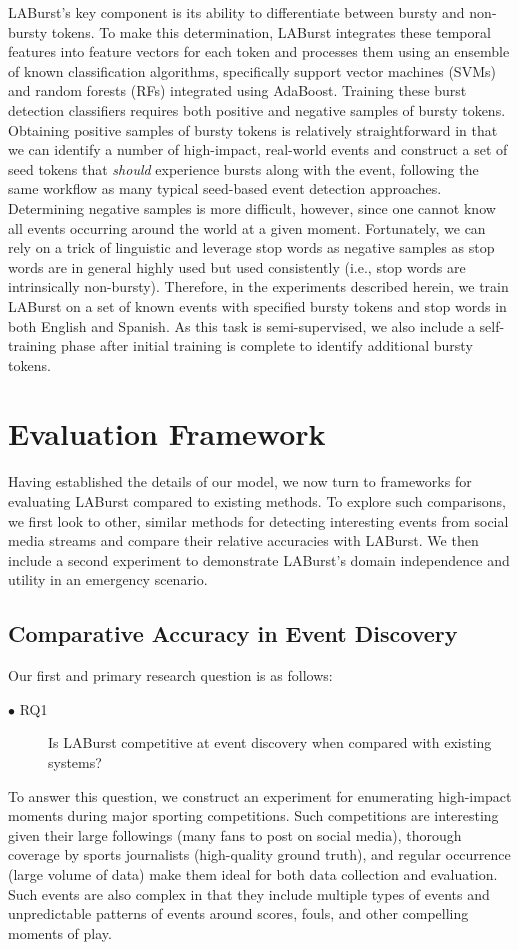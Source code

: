 \documentclass[letterpaper]{article}
\begin{document}
LABurst's key component is its ability to differentiate between bursty and non-bursty tokens.
To make this determination, LABurst integrates these temporal features into feature vectors for each token and processes them using an ensemble of known classification algorithms, specifically support vector machines (SVMs) and random forests (RFs) integrated using AdaBoost.
Training these burst detection classifiers requires both positive and negative samples of bursty tokens.
Obtaining positive samples of bursty tokens is relatively straightforward in that we can identify a number of high-impact, real-world events and construct a set of seed tokens that \emph{should} experience bursts along with the event, following the same workflow as many typical seed-based event detection approaches.
Determining negative samples is more difficult, however, since one cannot know all events occurring around the world at a given moment.
Fortunately, we can rely on a trick of linguistic and leverage stop words as negative samples as stop words are in general highly used but used consistently (i.e., stop words are intrinsically non-bursty).
Therefore, in the experiments described herein, we train LABurst on a set of known events with specified bursty tokens and stop words in both English and Spanish.
As this task is semi-supervised, we also include a self-training phase after initial training is complete to identify additional bursty tokens.

\section{Evaluation Framework}
\label{sect:methods}

Having established the details of our model, we now turn to frameworks for evaluating LABurst compared to existing methods.
To explore such comparisons, we first look to other, similar methods for detecting interesting events from social media streams and compare their relative accuracies with LABurst.
We then include a second experiment to demonstrate LABurst's domain independence and utility in an emergency scenario.

\subsection{Comparative Accuracy in Event Discovery}

Our first and primary research question is as follows:
\begin{description}
\item[$\bullet$ RQ1] Is LABurst competitive at event discovery when compared with existing systems?
\end{description}
To answer this question, we construct an experiment for enumerating high-impact moments during major sporting competitions.
Such competitions are interesting given their large followings (many fans to post on social media), thorough coverage by sports journalists (high-quality ground truth), and regular occurrence (large volume of data) make them ideal for both data collection and evaluation.
Such events are also complex in that they include multiple types of events and unpredictable patterns of events around scores, fouls, and other compelling moments of play.
\end{document}
